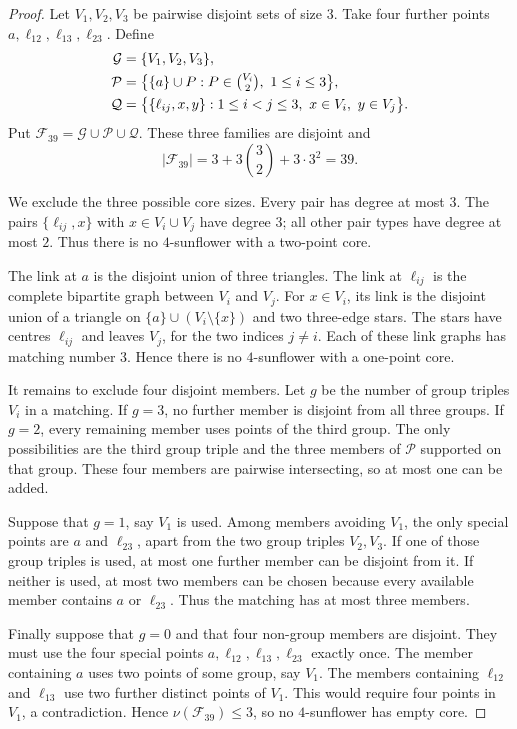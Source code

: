 \documentclass[11pt]{article}
\numberwithin{equation}{section}
\theoremstyle{definition}
\theoremstyle{remark}
\newcommand{\F}{\mathcal F}
\begin{document}
\begin{proof}
Let $V_1,V_2,V_3$ be pairwise disjoint sets of size $3$. Take four further
points $a,\ell_{12},\ell_{13},\ell_{23}$. Define
\begin{align*}
 \mathcal G&=\{V_1,V_2,V_3\},\\
 \mathcal P&=\bigl\{\{a\}\cup P:
        P\in\tbinom{V_i}{2},\ 1\le i\le3\bigr\},\\
 \mathcal Q&=\bigl\{\{\ell_{ij},x,y\}:
        1\le i<j\le3,\ x\in V_i,\ y\in V_j\bigr\}.
\end{align*}
Put $\F_{39}=\mathcal G\cup\mathcal P\cup\mathcal Q$. These three families
are disjoint and
\[
 |\F_{39}|=3+3\binom32+3\cdot3^2=39.
\]

We exclude the three possible core sizes. Every pair has degree at most $3$.
The pairs $\{\ell_{ij},x\}$ with $x\in V_i\cup V_j$ have degree $3$; all
other pair types have degree at most $2$. Thus there is no $4$-sunflower
with a two-point core.

The link at $a$ is the disjoint union of three triangles. The link at
$\ell_{ij}$ is the complete bipartite graph between $V_i$ and $V_j$. For
$x\in V_i$, its link is the disjoint union of a triangle on
$\{a\}\cup(V_i\setminus\{x\})$ and two three-edge stars. The stars have
centres $\ell_{ij}$ and leaves $V_j$, for the two indices $j\ne i$. Each of
these link graphs has matching number $3$. Hence there is no $4$-sunflower
with a one-point core.

It remains to exclude four disjoint members. Let $g$ be the number of group
triples $V_i$ in a matching. If $g=3$, no further member is disjoint from all
three groups. If $g=2$, every remaining member uses points of the third
group. The only possibilities are the third group triple and the three
members of $\mathcal P$ supported on that group. These four members are
pairwise intersecting, so at most one can be added.

Suppose that $g=1$, say $V_1$ is used. Among members avoiding $V_1$, the only
special points are $a$ and $\ell_{23}$, apart from the two group triples
$V_2,V_3$. If one of those group triples is used, at most one further member
can be disjoint from it. If neither is used, at most two members can be
chosen because every available member contains $a$ or $\ell_{23}$. Thus the
matching has at most three members.

Finally suppose that $g=0$ and that four non-group members are disjoint.
They must use the four special points
$a,\ell_{12},\ell_{13},\ell_{23}$ exactly once. The member containing $a$
uses two points of some group, say $V_1$. The members containing
$\ell_{12}$ and $\ell_{13}$ use two further distinct points of $V_1$. This
would require four points in $V_1$, a contradiction. Hence
$\nu(\F_{39})\le3$, so no $4$-sunflower has empty core.
\end{proof}
\end{document}
